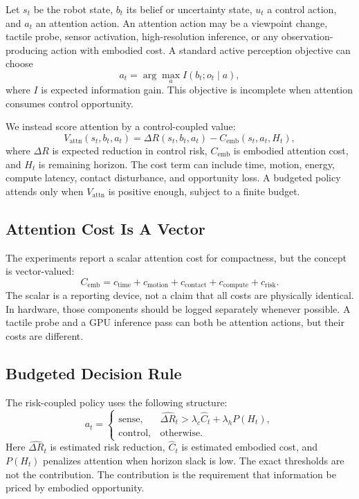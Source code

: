 \documentclass{article}
\begin{document}
Let $s_t$ be the robot state, $b_t$ its belief or uncertainty state, $u_t$ a
control action, and $a_t$ an attention action. An attention action may be a
viewpoint change, tactile probe, sensor activation, high-resolution inference,
or any observation-producing action with embodied cost. A standard active
perception objective can choose
\[
    a_t = \arg\max_a I(b_t; o_t \mid a),
\]
where $I$ is expected information gain. This objective is incomplete when
attention consumes control opportunity.

We instead score attention by a control-coupled value:
\[
    V_{\mathrm{attn}}(s_t,b_t,a_t)
    =
    \Delta R(s_t,b_t,a_t)
    -
    C_{\mathrm{emb}}(s_t,a_t,H_t),
\]
where $\Delta R$ is expected reduction in control risk, $C_{\mathrm{emb}}$ is
embodied attention cost, and $H_t$ is remaining horizon. The cost term can
include time, motion, energy, compute latency, contact disturbance, and
opportunity loss. A budgeted policy attends only when $V_{\mathrm{attn}}$ is
positive enough, subject to a finite budget.

\subsection{Attention Cost Is A Vector}

The experiments report a scalar attention cost for compactness, but the
concept is vector-valued:
\[
    C_{\mathrm{emb}} =
    c_{\mathrm{time}} + c_{\mathrm{motion}} + c_{\mathrm{contact}}
    + c_{\mathrm{compute}} + c_{\mathrm{risk}}.
\]
The scalar is a reporting device, not a claim that all costs are physically
identical. In hardware, those components should be logged separately whenever
possible. A tactile probe and a GPU inference pass can both be attention
actions, but their costs are different.

\subsection{Budgeted Decision Rule}

The risk-coupled policy uses the following structure:
\[
    a_t =
    \begin{cases}
    \mathrm{sense}, &
    \widehat{\Delta R}_t
    >
    \lambda_c \widehat{C}_t + \lambda_h P(H_t), \\
    \mathrm{control}, & \mathrm{otherwise}.
    \end{cases}
\]
Here $\widehat{\Delta R}_t$ is estimated risk reduction, $\widehat{C}_t$ is
estimated embodied cost, and $P(H_t)$ penalizes attention when horizon slack is
low. The exact thresholds are not the contribution. The contribution is the
requirement that information be priced by embodied opportunity.
\end{document}
